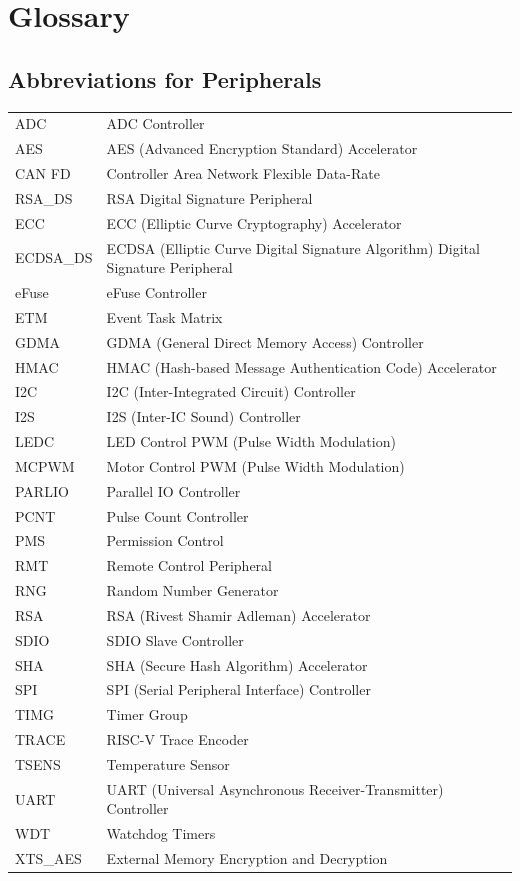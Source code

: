 \section*{Glossary}\label{glossary}
\rhead{\Navigation}

\subsection*{Abbreviations for Peripherals}

\begin{longtable}[c]{ R{3cm} p{12cm} }

ADC     & ADC Controller \\
AES     & AES (Advanced Encryption Standard) Accelerator \\
CAN FD  & Controller Area Network Flexible Data-Rate\\
RSA\_DS & RSA Digital Signature Peripheral \\
ECC     & ECC (Elliptic Curve Cryptography) Accelerator  \\
ECDSA\_DS   & ECDSA (Elliptic Curve Digital Signature Algorithm) Digital Signature Peripheral  \\
eFuse   & eFuse Controller \\
ETM     & Event Task Matrix \\
GDMA    & GDMA (General Direct Memory Access) Controller \\
HMAC    & HMAC (Hash-based Message Authentication Code) Accelerator \\
I2C     & I2C (Inter-Integrated Circuit) Controller \\
I2S     & I2S (Inter-IC Sound) Controller \\
LEDC    & LED Control PWM (Pulse Width Modulation)\\
MCPWM   & Motor Control PWM (Pulse Width Modulation) \\
PARLIO  & Parallel IO Controller \\
PCNT    & Pulse Count Controller \\
PMS     & Permission Control \\
RMT     & Remote Control Peripheral \\
RNG     & Random Number Generator \\
RSA     & RSA (Rivest Shamir Adleman) Accelerator \\
SDIO    & SDIO Slave Controller \\
SHA     & SHA (Secure Hash Algorithm) Accelerator \\
SPI     & SPI (Serial Peripheral Interface) Controller \\
TIMG    & Timer Group \\
TRACE   & RISC-V Trace Encoder \\
TSENS   & Temperature Sensor \\
UART    & UART (Universal Asynchronous Receiver-Transmitter) Controller \\
WDT     & Watchdog Timers \\
XTS\_AES & External Memory Encryption and Decryption \\


\end{longtable}
